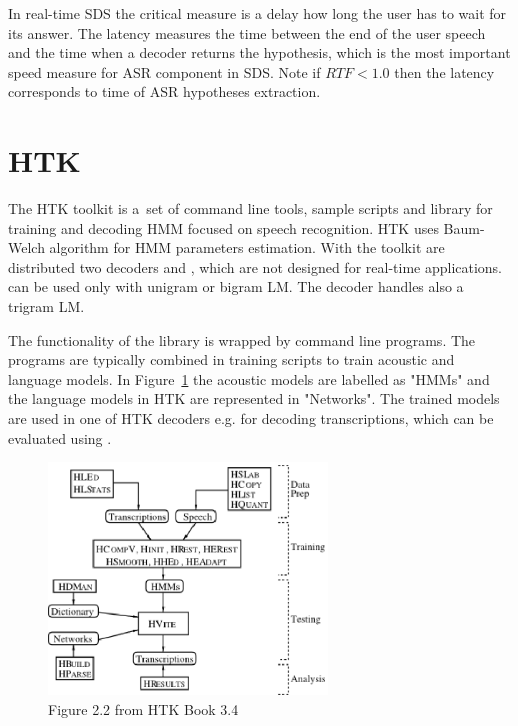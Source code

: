 {
In real-time \ac{SDS} the critical measure is a delay how long the user has to wait for its answer.
The latency measures the time between the end of the user speech and the time when a decoder returns the hypothesis, which is the most important speed measure for \ac{ASR} component in \ac{SDS}.
Note if $RTF < 1.0$ then the latency corresponds to time of \ac{ASR} hypotheses extraction.


\section{\ac{HTK}}
\label{sec:back_htk}
The \ac{HTK} toolkit is a~set of command line tools, sample scripts and library for training and decoding \ac{HMM} focused on speech recognition.
\ac{HTK} uses Baum-Welch algorithm for \ac{HMM} parameters estimation.
With the toolkit are distributed two decoders  and , which are not designed for real-time applications.
 can be used only with unigram or bigram \ac{LM}.
The  decoder handles also a trigram \ac{LM}.

The functionality of the library is wrapped by command line programs.
The programs are typically combined in training scripts to train acoustic and language models.
In Figure~\ref{fig:htk_tools} the acoustic models are labelled as "HMMs" 
and the language models in \ac{HTK} are represented in "Networks".
The trained models are used in one of \ac{HTK} decoders e.g.  for decoding transcriptions, which can be evaluated using .

\begin{figure}[!htp]
    \begin{center}
    \includegraphics[width=20em]{images/htk_tools.ps}
    \caption{Figure 2.2 from HTK Book 3.4\cite{young2006htk}}
    \label{fig:htk_tools} 
    \end{center}
\end{figure}

}
